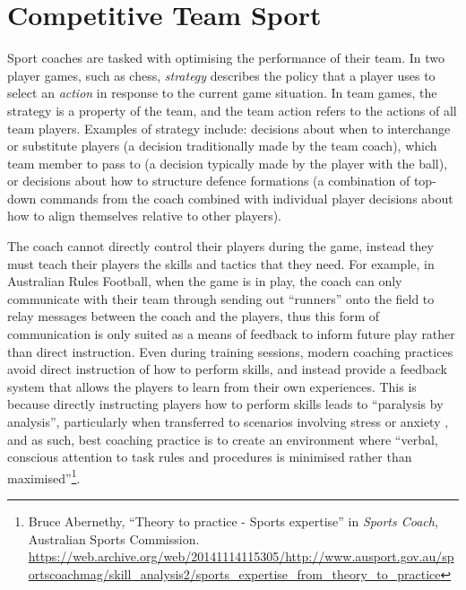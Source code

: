 \section{Competitive Team Sport}


Sport coaches are tasked with optimising the performance of their team.
In two player games, such as chess, \emph{strategy} describes the policy
that a player uses to select an \emph{action} in response to the current
game situation. In team games, the strategy is a property of the team,
and the team action refers to the actions of all team players. Examples
of strategy include: decisions about when to interchange or substitute
players (a decision traditionally made by the team coach), which team member to pass
to (a decision typically made by the player with the ball), or decisions about how
to structure defence formations (a combination of top-down commands from
the coach combined with individual player decisions about how to align
themselves relative to other players).

The coach cannot directly control their players during the game, instead
they must teach their players the skills and tactics that they need. For
example, in Australian Rules Football, when the game is in play, the
coach can only communicate with their team through sending out
``runners'' onto the field to relay messages between the coach and the
players, thus this form of communication is only suited as a means of
feedback to inform future play rather than direct instruction. Even during training sessions,
modern coaching practices avoid direct instruction of how to perform
skills, and instead provide a feedback system that allows the players to
learn from their own experiences. This is because directly instructing
players how to perform skills leads to ``paralysis by analysis'', particularly when transferred to scenarios involving stress or anxiety \cite{Smeeton2005}, and as such, best coaching practice is to create an environment where ``verbal,
conscious attention to task rules and procedures is minimised rather
than maximised''\footnote{Bruce Abernethy, %
  ``Theory to practice - Sports
  expertise'' in \emph{Sports Coach}, %
  Australian Sports Commission.
  \url{https://web.archive.org/web/20141114115305/http://www.ausport.gov.au/sportscoachmag/skill_analysis2/sports_expertise_from_theory_to_practice}}.

